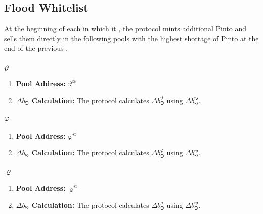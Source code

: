 \documentclass[class=article, crop=false]{standalone}
\begin{document}

\subsection{Flood Whitelist}

At the beginning of each  in which it , the protocol mints additional Pinto and sells them directly in the following pools with the highest shortage of Pinto at the end of the previous .


\subsubsection{$\vartheta$}

\begin{enumerate}
    \item \textbf{Pool Address:} $\vartheta^{@}$
    \item \textbf{$\Delta b_{\Game}$ Calculation:} The protocol calculates $\Delta b_{\Game}^{\vartheta}$ using $\Delta b_{\Game}^{\mathfrak{w}}$.
\end{enumerate}


\subsubsection{$\varphi$}

\begin{enumerate}
    \item \textbf{Pool Address:} $\varphi^{@}$
    \item \textbf{$\Delta b_{\Game}$ Calculation:} The protocol calculates $\Delta b_{\Game}^{\varphi}$ using $\Delta b_{\Game}^{\mathfrak{w}}$.
\end{enumerate}


\subsubsection{$\varrho$}

\begin{enumerate}
    \item \textbf{Pool Address:} $\varrho^{@}$
    \item \textbf{$\Delta b_{\Game}$ Calculation:} The protocol calculates $\Delta b_{\Game}^{\varrho}$ using $\Delta b_{\Game}^{\mathfrak{w}}$.
\end{enumerate}
\end{document}

